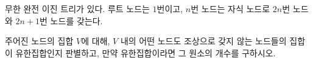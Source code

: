 무한 완전 이진 트리가 있다. 루트 노드는 $1$번이고, $n$번 노드는 자식 노드로 $2n$번 노드와 $2n + 1$번 노드를 갖는다.

주어진 노드의 집합 $V$에 대해, $V$ 내의 어떤 노드도 조상으로 갖지 않는 노드들의 집합이 유한집합인지 판별하고, 만약 유한집합이라면 그 원소의 개수를 구하시오.
